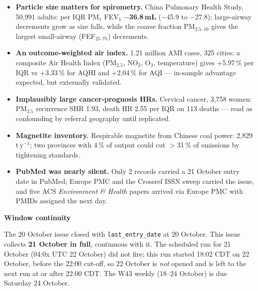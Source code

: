 \documentclass[10pt]{article}
\begin{document}
\footnotesize
\begin{itemize}

\item \textbf{Particle size matters for spirometry.} China Pulmonary Health Study, 50,991 adults: per IQR PM$_1$
FEV$_1$ \textbf{$-$36.8\,mL} ($-$45.9 to $-$27.8); large-airway decrements grow as size falls, while the coarse
fraction PM$_{2.5\text{--}10}$ gives the largest small-airway (FEF$_{25\text{--}75}$) decrements.

\item \textbf{An outcome-weighted air index.} 1.21 million AMI cases, 325 cities: a composite Air Health Index
(PM$_{2.5}$, NO$_2$, O$_3$, temperature) gives +5.97\,\% per IQR vs +3.33\,\% for AQHI and +2.04\,\% for AQI ---
in-sample advantage expected, but externally validated.

\item \textbf{Implausibly large cancer-prognosis HRs.} Cervical cancer, 3,758 women: PM$_{2.5}$ recurrence SHR
1.93, death HR 2.55 per IQR on 113 deaths --- read as confounding by referral geography until replicated.

\item \textbf{Magnetite inventory.} Respirable magnetite from Chinese coal power: 2,829\,t\,y$^{-1}$; two provinces
with 4\,\% of output could cut $>$31\,\% of emissions by tightening standards.

\item \textbf{PubMed was nearly silent.} Only 2 records carried a 21 October entry date in PubMed; Europe PMC and
the Crossref ISSN sweep carried the issue, and five ACS \emph{Environment \& Health} papers arrived via Europe PMC
with PMIDs assigned the next day.

\end{itemize}

\vspace{2mm}

\begin{keybox}
{\sffamily\bfseries\footnotesize\color{Deep}Window continuity}\\[1.2mm]
{\fontsize{7.2}{8.8}\selectfont
The 20 October issue closed with \texttt{last\_entry\_date} at 20 October. This issue collects
\textbf{21 October in full}, continuous with it. The scheduled run for 21 October (04:0x UTC 22 October) did not
fire; this run started 18:02 CDT on 22 October, before the 22:00 cut-off, so 22 October is \emph{not} opened and
is left to the next run at or after 22:00 CDT. The W43 weekly (18--24 October) is due Saturday 24 October.\par}
\end{keybox}
\end{document}
